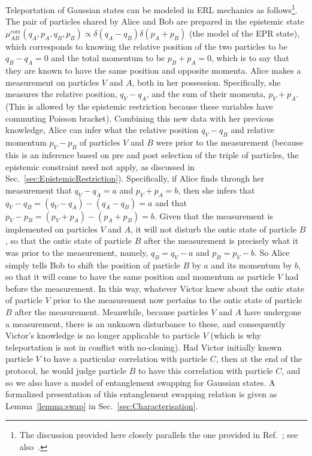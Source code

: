 \documentclass[pra,superscriptaddress,nofootinbib,12pt]{revtex4-2}
\begin{document}
Teleportation of Gaussian states can be modeled in ERL mechanics as follows\footnote{The discussion provided here closely parallels the one provided in Ref.~\cite{Spe07}; see also~\cite{Cav04}.}.  The pair of particles shared by Alice and Bob are prepared in the epistemic state $\mu^{\text{corr}}_{AB}(q_A,p_A,q_B,p_B)\propto \delta(q_A-q_B)\delta(p_A+p_B)$ (the model of the EPR state), which corresponds to knowing the relative position of the two particles to be $q_B-q_A = 0$ and the total momentum to be $p_B+p_A =0$, which is to say that they are known to have the same position and opposite momenta.
Alice makes a measurement on particles $V$ and $A$, both in her possession.  Specifically, she measures the relative position, $q_V-q_A$, and the sum of their momenta, $p_V+p_A$.  (This is allowed by the epistemic restriction because these variables have commuting Poisson bracket).   Combining this new data with her previous knowledge, Alice can infer what the relative position $q_V-q_B$ and relative momentum $p_V-p_B$ of particles $V$ and $B$ were prior to the measurement (because this is an inference based on pre and post selection of the triple of particles, the epistemic constraint need not apply, as discussed in Sec.~\ref{sec:EpistemicRestriction}).  Specifically, if Alice finds through her measurement that $q_V-q_A= a$ and $p_V+p_A=b$, then she infers that $q_V- q_B = (q_V-q_A) - (q_A-q_B) =a$ and that $p_V- p_B = (p_V + p_A) - (p_A+ p_B) =b$.
Given that the measurement is implemented on particles $V$ and $A$, it will not disturb the ontic state of particle $B$, so that the ontic state of particle $B$ after the measurement is precisely what it was prior to the measurement, namely, $q_B = q_V - a$ and $p_B = p_V - b$.  So Alice simply tells Bob to shift the position of particle $B$ by $a$ and its momentum by $b$, so that it will come to have the same position and momentum as particle $V$ had before the measurement.  In this way, whatever Victor knew about the ontic state of particle $V$ prior to the measurement now pertains to the ontic state of particle $B$ after the measurement.  Meanwhile, because particles $V$ and $A$ have undergone a measurement, there is an unknown disturbance to these, and consequently Victor's knowledge is no longer applicable to particle $V$ (which is why teleportation is not in conflict with no-cloning).  Had Victor initially known particle $V$ to have a particular correlation with particle $C$, then at the end of the protocol, he would judge particle $B$ to have this correlation with particle $C$, and so we also have a model of entanglement swapping for Gaussian states.  A formalized presentation of this entanglement swapping relation is given as Lemma~\ref{lemma:swap} in Sec.~\ref{sec:Characterisation}.
\end{document}
